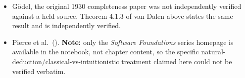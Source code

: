 \begin{itemize}
\item
  Gödel, the original 1930 completeness paper was not independently verified against a held source. Theorem 4.1.3 of van Dalen above states the same result and is independently verified.
\item
  Pierce et al.~(\cite{PierceSF}). \textbf{Note:} only the \emph{Software Foundations} series homepage is available in the notebook, not chapter content, so the specific natural-deduction/classical-vs-intuitionistic treatment claimed here could not be verified verbatim.
\end{itemize}
